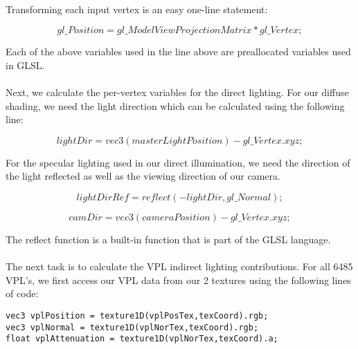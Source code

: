 \paragraph{}
Transforming each input vertex is an easy one-line statement:

\begin{equation}
gl\_Position = gl\_ModelViewProjectionMatrix * gl\_Vertex;
\end{equation}

Each of the above variables used in the line above are preallocated variables used in GLSL.

\paragraph{}
Next, we calculate the per-vertex variables for the direct lighting.  For our diffuse shading, we need the light direction which can be calculated using the following line:

\begin{equation}
lightDir = vec3(masterLightPosition) - gl\_Vertex.xyz;
\end{equation}

For the specular lighting used in our direct illumination, we need the direction of the light reflected as well as the viewing direction of our camera.

\begin{equation}
lightDirRef = reflect(-lightDir, gl\_Normal);
\end{equation}

\begin{equation}
camDir = vec3(cameraPosition) - gl\_Vertex.xyz;
\end{equation}

The reflect function is a built-in function that is part of the GLSL language.  

\paragraph{}
The next task is to calculate the VPL indirect lighting contributions.  For all 6485 VPL's, we first access our VPL data from our 2 textures using the following lines of code:

\begin{lstlisting}
vec3 vplPosition = texture1D(vplPosTex,texCoord).rgb;
vec3 vplNormal = texture1D(vplNorTex,texCoord).rgb;
float vplAttenuation = texture1D(vplNorTex,texCoord).a;
\end{lstlisting}

